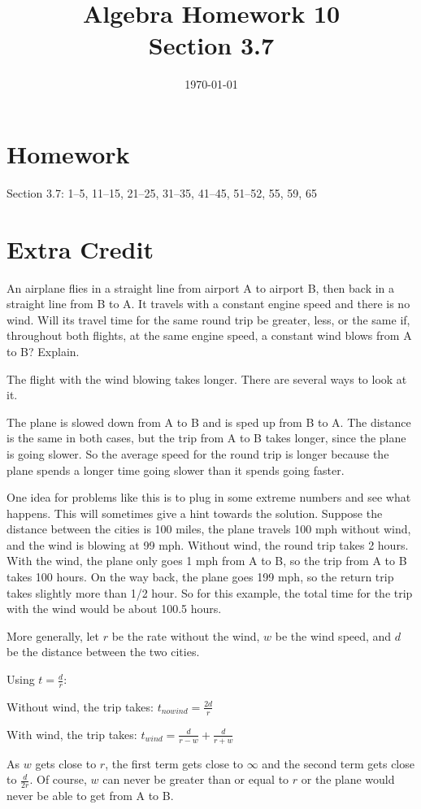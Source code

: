 \documentclass[letterpaper, landscape]{exam}
\title{Algebra Homework 10 \\ Section 3.7}
\author{}
\date{\today}
\begin{document}
  \maketitle

  \section{Homework}

  Section 3.7: 1--5, 11--15, 21--25, 31--35, 41--45, 51--52, 55, 59, 65

  \section{Extra Credit}

  An airplane flies in a straight line from airport A to airport B, then back
  in a straight line from B to A.  It travels with a constant engine speed and
  there is no wind.  Will its travel time for the same round trip be greater,
  less, or the same if, throughout both flights, at the same engine speed, a
  constant wind blows from A to B\@?  Explain.

  \begin{solution}
    The flight with the wind blowing takes longer.  There are several ways to
    look at it.

    The plane is slowed down from A to B and is sped up from B to A.  The
    distance is the same in both cases, but the trip from A to B takes longer,
    since the plane is going slower.  So the average speed for the round trip
    is longer because the plane spends a longer time going slower than it
    spends going faster.

    One idea for problems like this is to plug in some extreme numbers and see
    what happens.  This will sometimes give a hint towards the solution.
    Suppose the distance between the cities is 100 miles, the plane travels 100
    mph without wind, and the wind is blowing at 99 mph.  Without wind, the
    round trip takes 2 hours.  With the wind, the plane only goes 1 mph from A
    to B, so the trip from A to B takes 100 hours.  On the way back, the plane
    goes 199 mph, so the return trip takes slightly more than 1/2 hour.  So for
    this example, the total time for the trip with the wind would be about
    100.5 hours.

    More generally, let $r$ be the rate without the wind, $w$ be the wind
    speed, and $d$ be the distance between the two cities.  

    Using $t = \frac{d}{r}$:
    \begin{itemize*}
    \item Without wind, the trip takes: $t_{no wind} = \frac{2d}{r}$
    \item With wind, the trip takes: $t_{wind} = \frac{d}{r - w} + \frac{d}{r + w}$
    \end{itemize*}

    As $w$ gets close to $r$, the first term gets close to $\infty$ and the
    second term gets close to $\frac{d}{2r}$.  Of course, $w$ can never be
    greater than or equal to $r$ or the plane would never be able to get from A
    to B.

  \end{solution}
\end{document}
